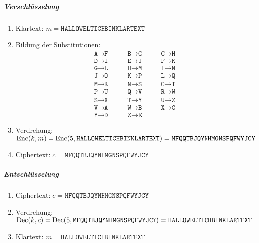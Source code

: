 					\subparagraph{Verschlüsselung}
						\begin{enumerate}
							\item[] Klartext: \( m = \texttt{HALLOWELTICHBINKLARTEXT} \)
							\item Bildung der Substitutionen:
								\begin{equation*}
									\begin{matrix*}
										\texttt{A} \rightarrow \texttt{F} & \qquad \texttt{B} \rightarrow \texttt{G} & \qquad \texttt{C} \rightarrow \texttt{H} \\
										\texttt{D} \rightarrow \texttt{I} & \qquad \texttt{E} \rightarrow \texttt{J} & \qquad \texttt{F} \rightarrow \texttt{K} \\
										\texttt{G} \rightarrow \texttt{L} & \qquad \texttt{H} \rightarrow \texttt{M} & \qquad \texttt{I} \rightarrow \texttt{N} \\
										\texttt{J} \rightarrow \texttt{O} & \qquad \texttt{K} \rightarrow \texttt{P} & \qquad \texttt{L} \rightarrow \texttt{Q} \\
										\texttt{M} \rightarrow \texttt{R} & \qquad \texttt{N} \rightarrow \texttt{S} & \qquad \texttt{O} \rightarrow \texttt{T} \\
										\texttt{P} \rightarrow \texttt{U} & \qquad \texttt{Q} \rightarrow \texttt{V} & \qquad \texttt{R} \rightarrow \texttt{W} \\
										\texttt{S} \rightarrow \texttt{X} & \qquad \texttt{T} \rightarrow \texttt{Y} & \qquad \texttt{U} \rightarrow \texttt{Z} \\
										\texttt{V} \rightarrow \texttt{A} & \qquad \texttt{W} \rightarrow \texttt{B} & \qquad \texttt{X} \rightarrow \texttt{C} \\
										\texttt{Y} \rightarrow \texttt{D} & \qquad \texttt{Z} \rightarrow \texttt{E}
									\end{matrix*}
								\end{equation*}
							\item Verdrehung: \( \operatorname{Enc}(k, m) = \operatorname{Enc}(5, \texttt{HALLOWELTICHBINKLARTEXT}) = \texttt{MFQQTBJQYNHMGNSPQFWYJCY} \)
							\item[] Ciphertext: \( c = \texttt{MFQQTBJQYNHMGNSPQFWYJCY} \)
						\end{enumerate}

					\subparagraph{Entschlüsselung}
						\begin{enumerate}
							\item[] Ciphertext: \( c = \texttt{MFQQTBJQYNHMGNSPQFWYJCY} \)
							\item Verdrehung: \( \operatorname{Dec}(k, c) = \operatorname{Dec}(5, \texttt{MFQQTBJQYNHMGNSPQFWYJCY}) = \texttt{HALLOWELTICHBINKLARTEXT} \)
							\item[] Klartext: \( m = \texttt{HALLOWELTICHBINKLARTEXT} \)
						\end{enumerate}

